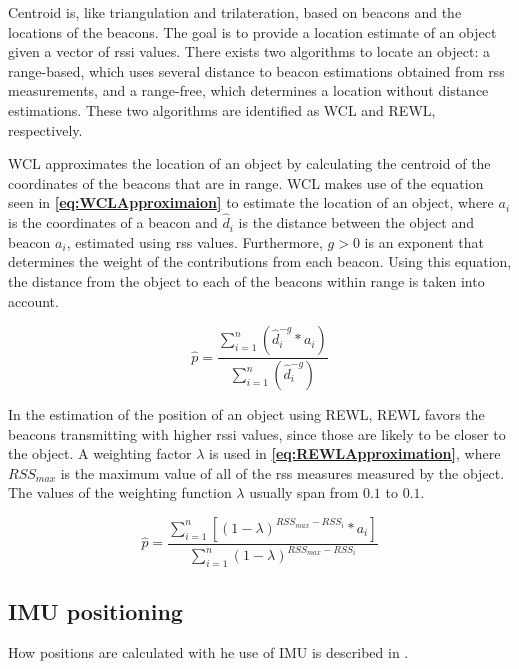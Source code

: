 Centroid is, like triangulation and trilateration, based on beacons and the locations of the beacons. The goal is to provide a location estimate of an object given a vector of \gls{rssi} values. There exists two algorithms to locate an object: a range-based, which uses several distance to beacon estimations obtained from \gls{rss} measurements, and a range-free, which determines a location without distance estimations. These two algorithms are identified as WCL and REWL, respectively.

WCL approximates the location of an object by calculating the centroid of the coordinates of the beacons that are in range. WCL makes use of the equation seen in \textbf{\autoref{eq:WCLApproximaion}} to estimate the location of an object, where $a_i$ is the coordinates of a beacon and $\hat{d}_i$ is the distance between the object and beacon $a_i$, estimated using \gls{rss} values. Furthermore, $g > 0$ is an exponent that determines the weight of the contributions from each beacon. Using this equation, the distance from the object to each of the beacons within range is taken into account.

\begin{equation} \label{eq:WCLApproximaion}
    \hat{p} = \frac{\sum_{i = 1}^{n} (\hat{d}_i^{-g} * a_i)}{\sum_{i = 1}^{n} (\hat{d}_i^{-g})}
\end{equation}

In the estimation of the position of an object using REWL, REWL favors the beacons transmitting with higher \gls{rssi} values, since those are likely to be closer to the object. A weighting factor $\lambda$ is used in \textbf{\autoref{eq:REWLApproximation}}, where $RSS_{max}$ is the maximum value of all of the \gls{rss} measures measured by the object. The values of the weighting function $\lambda$ usually span from $0.1$ to $0.1$.

\begin{equation} \label{eq:REWLApproximation}
    \hat{p} = \frac{\sum_{i = 1}^{n} [(1 - \lambda)^{RSS_{max} - RSS_{i}} * a_i]}{\sum_{i = 1}^{n} (1 - \lambda)^{RSS_{max} - RSS_{i}}}
\end{equation}

\subsection{IMU positioning} \label{sec:IMUPositioning} %
How positions are calculated with he use of IMU is described in \cite{IMUPositioning}.

